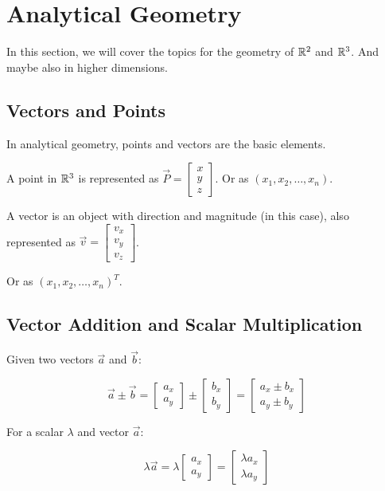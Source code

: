 \newpage
\section{Analytical Geometry}

In this section, we will cover the topics for the geometry of \(\mathbb{R}^2\) and \(\mathbb{R}^3\).
And maybe also in higher dimensions.

\subsection{Vectors and Points}

In analytical geometry, points and vectors are the basic elements.

A point in \(\mathbb{R}^3\) is represented as \(\vec{P} = \begin{bmatrix} x \\ y \\ z \end{bmatrix}\).
Or as \((x_1, x_2, \dots , x_n)\).

A vector is an object with direction and magnitude (in this case), also represented as \(\vec{v} = \begin{bmatrix} v_x \\ v_y \\ v_z \end{bmatrix}\).

Or as \({(x_1, x_2, \dots , x_n)}^{T}\).

\subsection{Vector Addition and Scalar Multiplication}

Given two vectors \(\vec{a}\) and \(\vec{b}\):

\[
	\vec{a} \pm  \vec{b} = \begin{bmatrix} a_x \\ a_y \end{bmatrix} \pm \begin{bmatrix} b_x \\ b_y \end{bmatrix} = \begin{bmatrix} a_x \pm b_x \\ a_y \pm b_y \end{bmatrix}
\]

For a scalar \(\lambda\) and vector \(\vec{a}\):

\[
	\lambda \vec{a} = \lambda \begin{bmatrix} a_x \\ a_y \end{bmatrix} = \begin{bmatrix} \lambda a_x \\ \lambda a_y \end{bmatrix}
\]

